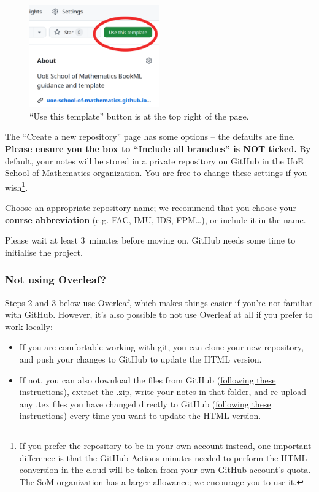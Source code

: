 \begin{figure}[h]
    \centering
    \includegraphics[width=0.5\textwidth]{img/use_template.png}
    \caption{``Use this template'' button is at the top right of the page.}
    \label{fig:use-template}
\end{figure}

The ``Create a new repository'' page has some options -- the defaults are fine. \textbf{Please ensure you the box to ``Include all branches'' is NOT ticked.} By default, your notes will be stored in a private repository on GitHub in the UoE School of Mathematics organization. You are free to change these settings if you wish\footnote{If you prefer the repository to be in your own account instead, one important difference is that the GitHub Actions minutes needed to perform the HTML conversion in the cloud will be taken from your own GitHub account's quota. The SoM organization has a larger allowance; we encourage you to use it.}.

Choose an appropriate repository name; we recommend that you choose your \textbf{course abbreviation} (e.g. FAC, IMU, IDS, FPM\ldots), or include it in the name.

Please wait at least 3~minutes before moving on. GitHub needs some time to initialise the project.

\subsubsection{Not using Overleaf?}

Steps 2 and 3 below use Overleaf, which makes things easier if you're not familiar with GitHub. However, it's also possible to not use Overleaf at all if you prefer to work locally:

\begin{itemize}
    \item If you are comfortable working with git, you can clone your new repository, and push your changes to GitHub to update the HTML version.
    \item If not, you can also download the files from GitHub (\href{https://docs.github.com/en/get-started/start-your-journey/downloading-files-from-github#downloading-a-repositorys-files}{following these instructions}), extract the .zip, write your notes in that folder, and re-upload any .tex files you have changed directly to GitHub (\href{https://docs.github.com/en/get-started/start-your-journey/uploading-a-project-to-github#step-2-upload-files-to-your-projects-repository}{following these instructions}) every time you want to update the HTML version.
\end{itemize}

